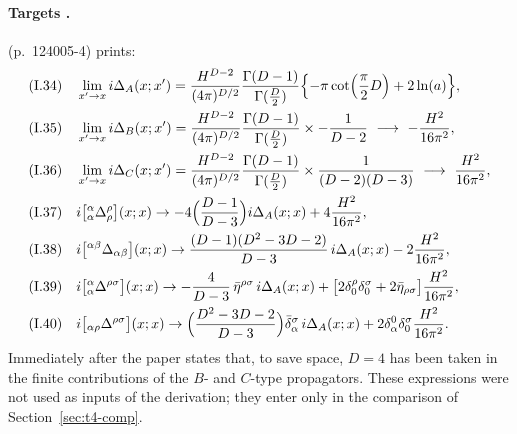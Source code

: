 \paragraph{Targets \tP.} \PI{} (p.~124005-4) prints:
\begin{align*}
\text{(I.34)}\quad&\lim_{x'\to x}i\Delta_A(x;x')=\frac{H^{D-2}}{(4\pi)^{D/2}}\frac{\Gamma(D-1)}{\Gamma(\frac D2)}\Bigl\{-\pi\cot\Bigl(\frac\pi2D\Bigr)+2\ln(a)\Bigr\},\\
\text{(I.35)}\quad&\lim_{x'\to x}i\Delta_B(x;x')=\frac{H^{D-2}}{(4\pi)^{D/2}}\frac{\Gamma(D-1)}{\Gamma(\frac D2)}\times-\frac{1}{D-2}\ \longrightarrow\ -\frac{H^2}{16\pi^2},\\
\text{(I.36)}\quad&\lim_{x'\to x}i\Delta_C(x;x')=\frac{H^{D-2}}{(4\pi)^{D/2}}\frac{\Gamma(D-1)}{\Gamma(\frac D2)}\times\frac{1}{(D-2)(D-3)}\ \longrightarrow\ \frac{H^2}{16\pi^2},\\
\text{(I.37)}\quad&i\bigl[{}^\alpha_\alpha\Delta^\rho_\rho\bigr](x;x)\to-4\Bigl(\frac{D-1}{D-3}\Bigr)i\Delta_A(x;x)+4\frac{H^2}{16\pi^2},\\
\text{(I.38)}\quad&i\bigl[{}^{\alpha\beta}\Delta_{\alpha\beta}\bigr](x;x)\to\frac{(D-1)(D^2-3D-2)}{D-3}\,i\Delta_A(x;x)-2\frac{H^2}{16\pi^2},\\
\text{(I.39)}\quad&i\bigl[{}^\alpha_\alpha\Delta^{\rho\sigma}\bigr](x;x)\to-\frac{4}{D-3}\,\bar\eta^{\rho\sigma}\,i\Delta_A(x;x)+\bigl[2\delta^\rho_0\delta^\sigma_0+2\bar\eta_{\rho\sigma}\bigr]\frac{H^2}{16\pi^2},\\
\text{(I.40)}\quad&i\bigl[{}_{\alpha\rho}\Delta^{\rho\sigma}\bigr](x;x)\to\Bigl(\frac{D^2-3D-2}{D-3}\Bigr)\bar\delta^\sigma_\alpha\,i\Delta_A(x;x)+2\delta^0_\alpha\delta^\sigma_0\frac{H^2}{16\pi^2}.
\end{align*}
Immediately after  the paper states that, to save space, \(D=4\) has been taken in
the finite contributions of the \(B\)- and \(C\)-type propagators. These expressions were
not used as inputs of the derivation; they enter only in the comparison of
Section~\ref{sec:t4-comp}.

